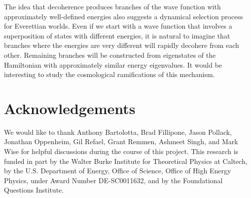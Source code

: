 \documentclass[aps,prd,onecolumn,nofootinbib,notitlepage]{revtex4-1}
\begin{document}
The idea that decoherence produces branches of the wave function with approximately well-defined energies also suggests a dynamical selection process for Everettian worlds.
Even if we start with a wave function that involves a superposition of states with different energies, it is natural to imagine that branches where the energies are very different will rapidly decohere from each other.
Remaining branches will be constructed from eigenstates of the Hamiltonian with approximately similar energy eigenvalues.
It would be interesting to study the cosmological ramifications of this mechanism.



\section*{Acknowledgements}
We would like to thank Anthony Bartolotta, Brad Fillipone, Jason Pollack, Jonathan Oppenheim, Gil Refael, Grant Remmen, Ashmeet Singh, and Mark Wise for helpful discussions during the course of this project. This research is funded in part by the Walter Burke Institute for Theoretical Physics at Caltech, by the U.S. Department of Energy, Office of Science, Office of High Energy Physics, under Award Number DE-SC0011632, and by the Foundational Questions Institute.




\end{document}
